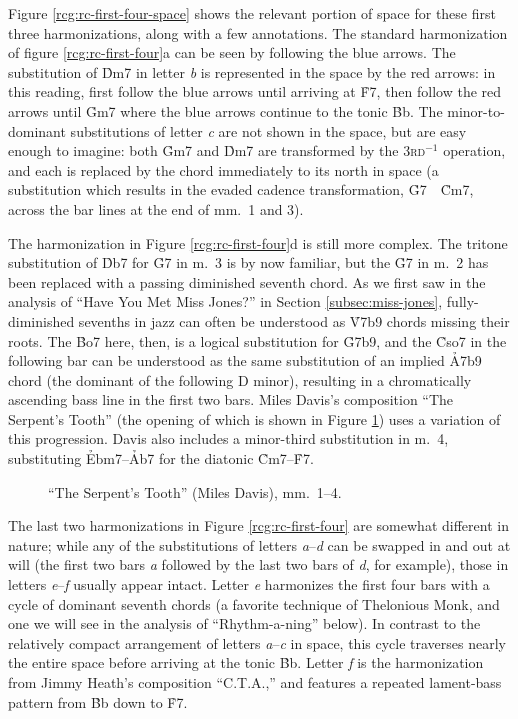 Figure \ref{rcg:rc-first-four-space} shows the relevant portion of \tf space
for these first three harmonizations, along with a few annotations. The
standard harmonization of figure \ref{rcg:rc-first-four}a can be seen by
following the blue arrows. The substitution of \h{Dm7} in letter \emph{b} is
represented in the space by the red arrows: in this reading, first follow the
blue arrows until arriving at \h{F7}, then follow the red arrows until \h{Gm7}
where the blue arrows continue to the tonic \h{Bb}. The minor-to-dominant
substitutions of letter \emph{c} are not shown in the space, but are easy
enough to imagine: both \h{Gm7} and \h{Dm7} are transformed by the
\textsc{3rd}$^{-1}$ operation, and each is replaced by the chord immediately
to its north in \tf space (a substitution which results in the evaded cadence
transformation, \mbox{\h{G7} \ECarrow\ \h{Cm7}}, across the bar lines at the
end of mm.~1 and 3).

The harmonization in Figure \ref{rcg:rc-first-four}d is still more complex.
The tritone substitution of \h{Db7} for \h{G7} in m.~3 is by now familiar, but
the \h{G7} in m.~2 has been replaced with a passing diminished seventh chord.
As we first saw in the analysis of ``Have You Met Miss Jones?'' in Section
\ref{subsec:miss-jones}, fully-diminished sevenths in jazz can often be understood
as \h{V7b9} chords missing their roots. The \h{Bo7} here, then, is a logical
substitution for \h{G7b9}, and the \h{Cso7} in the following bar can be
understood as the same substitution of an implied \h{A7b9} chord (the dominant
of the following D minor), resulting in a chromatically ascending bass line in
the first two bars. Miles Davis's composition ``The Serpent's Tooth'' (the
opening of which is shown in Figure \ref{rcg:serpents-tooth}) uses a variation
of this progression. Davis also includes a minor-third substitution in m.~4,
substituting \h{Ebm7}--\h{Ab7} for the diatonic \h{Cm7}--\h{F7}.

\begin{figure}[tbp]
  \caption{``The Serpent's Tooth'' (Miles Davis), mm.~1--4.}
  \label{rcg:serpents-tooth}
\end{figure}

The last two harmonizations in Figure \ref{rcg:rc-first-four} are somewhat
different in nature; while any of the substitutions of letters
\emph{a}--\emph{d} can be swapped in and out at will (the first two bars
\emph{a} followed by the last two bars of \emph{d}, for example), those in
letters \emph{e}--\emph{f} usually appear intact. Letter \emph{e} harmonizes
the first four bars with a cycle of dominant seventh chords (a favorite
technique of Thelonious Monk, and one we will see in the analysis of
``Rhythm-a-ning'' below). In contrast to the relatively compact arrangement of
letters \emph{a}--\emph{c} in \tf space, this cycle traverses nearly the
entire space before arriving at the tonic \h{Bb}. Letter \emph{f} is
the harmonization from Jimmy Heath's composition ``C.T.A.,'' and features a
repeated lament-bass pattern from \h{Bb} down to \h{F7}.

